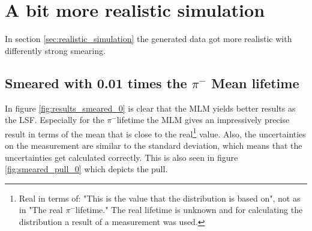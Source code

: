 \documentclass[11pt, a4paper, oneside]{book}
\newcommand{\pion}{$\pi^{-}$}
\begin{document}
\newpage
\section{A bit more realistic simulation}

In section \ref{sec:realistic_simulation} the generated data got more realistic with differently strong smearing.

\subsection{Smeared with 0.01 times the \texorpdfstring{\pion}{pion} Mean lifetime}

In figure \ref{fig:results_smeared_0} is clear that the MLM yields better results as the LSF. Especially for the \pion lifetime the MLM gives an impressively precise result in terms of the mean that is close to the real\footnote{Real in terms of: "This is the value that the distribution is based on", not as in "The real \pion lifetime." The real lifetime is unknown and for calculating the distribution a result of a measurement was used.} value. Also, the uncertainties on the measurement are similar to the standard deviation, which means that the uncertainties get calculated correctly. This is also seen in figure \ref{fig:smeared_pull_0} which depicts the pull.
\end{document}
